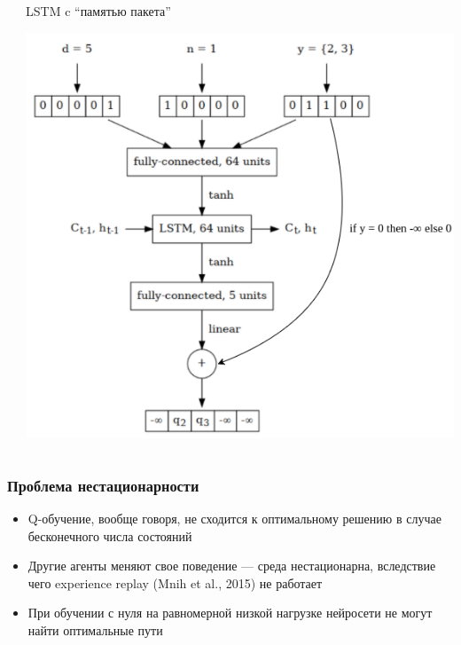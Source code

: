\documentclass{beamer}
\begin{document}
\begin{frame}
\begin{columns}
\begin{column}{0.3\textwidth}
\begin{center}
      \end{center}
    \end{column}
    \begin{column}{0.3\textwidth}
      LSTM c ``памятью пакета''
      \begin{center}
        \includegraphics[width=\textwidth]{nn-4-final}
      \end{center}
    \end{column}
  \end{columns}
\end{frame}


\begin{frame}
  \frametitle{Проблема нестационарности}
  \begin{itemize}
    \item Q-обучение, вообще говоря, не сходится к оптимальному решению в случае
      бесконечного числа состояний
    \item Другие агенты меняют свое поведение --- среда нестационарна,
      вследствие чего experience replay (Mnih et al., 2015) не работает
    \item При обучении с нуля на равномерной низкой нагрузке нейросети не могут
      найти оптимальные пути
  \end{itemize}
\end{frame}
\end{document}
